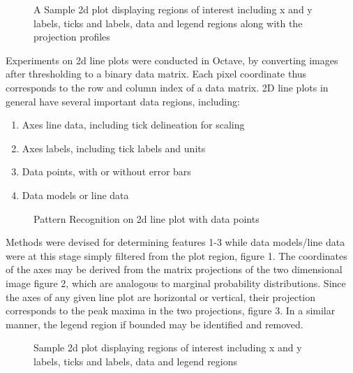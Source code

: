 \documentclass[12pt]{article}
\begin{document}
 \begin{figure}
 \begin{center}
\caption{A Sample 2d plot displaying regions of interest including x and y labels, ticks and labels, data and legend regions along with the projection profiles}
\end{center}
\end{figure} 



Experiments on 2d line plots were conducted in Octave, by converting images after thresholding to a binary data matrix.
 Each pixel coordinate thus corresponds  to the row and column index of a data matrix. 2D line plots in general have several important data regions, including:
\begin{enumerate}

\item Axes line data, including tick delineation for scaling
\item Axes labels, including tick labels and units
\item Data points, with or without error bars
\item Data models or line data
\end{enumerate}



\begin{figure}
 \begin{center}
\caption{Pattern Recognition on 2d line plot with data points}
\end{center}
\end{figure}

Methods were devised for determining features 1-3 while data models/line data were at this stage simply filtered from the plot region, figure 1. The coordinates of the axes  may be derived from the matrix projections of the two dimensional image figure 2, which are analogous to marginal probability distributions. Since the axes of any given line plot are horizontal or vertical, their projection corresponds to the peak maxima in the two projections, figure 3. In a similar manner, the legend region if bounded may be identified and removed.
 

 \begin{figure}

 \begin{center}


\caption{Sample 2d plot displaying regions of interest including x and y labels, ticks and labels, data and legend regions}
\end{center}
\end{figure} 
\end{document}
